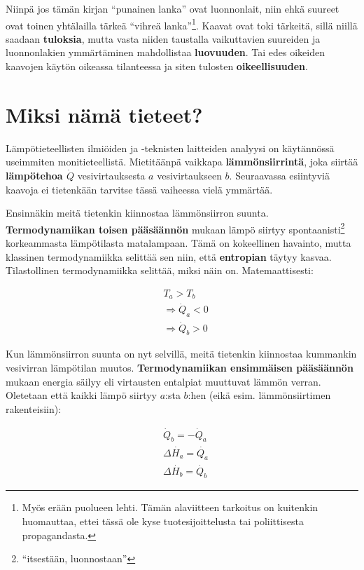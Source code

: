 \documentclass[12pt,a4paper,finnish]{book}
\begin{document}
Niinpä jos tämän kirjan ``punainen lanka'' ovat luonnonlait, niin ehkä suureet ovat toinen yhtälailla tärkeä
``vihreä lanka''\footnote{Myös erään puolueen lehti. Tämän alaviitteen tarkoitus on kuitenkin huomauttaa, 
ettei tässä ole kyse tuotesijoittelusta tai poliittisesta propagandasta.}. Kaavat ovat toki tärkeitä, sillä 
niillä saadaan \textbf{tuloksia}, mutta vasta niiden taustalla vaikuttavien suureiden ja luonnonlakien 
ymmärtäminen mahdollistaa \textbf{luovuuden}. Tai edes oikeiden kaavojen käytön oikeassa tilanteessa ja siten 
tulosten \textbf{oikeellisuuden}.

\section{Miksi nämä tieteet?}

Lämpötieteellisten ilmiöiden ja -teknisten laitteiden analyysi on käytännössä useimmiten monitieteellistä. 
Mietitäänpä vaikkapa \textbf{lämmönsiirrintä}, joka siirtää \textbf{lämpötehoa $\dot{Q}$} vesivirtauksesta $a$ 
vesivirtaukseen $b$. Seuraavassa esiintyviä kaavoja ei tietenkään tarvitse tässä vaiheessa vielä ymmärtää.

Ensinnäkin meitä tietenkin kiinnostaa lämmönsiirron suunta. \textbf{Termodynamiikan toisen pääsäännön} mukaan 
lämpö siirtyy spontaanisti\footnote{``itsestään, luonnostaan''} korkeammasta lämpötilasta matalampaan. Tämä on 
kokeellinen havainto, mutta klassinen termodynamiikka selittää sen niin, että \textbf{entropian} täytyy kasvaa. 
Tilastollinen termodynamiikka selittää, miksi näin on. Matemaattisesti:

\begin{align}
 &T_a > T_b\\
 &\Rightarrow \dot{Q}_a < 0\\
 &\Rightarrow \dot{Q}_b > 0
\end{align}

Kun lämmönsiirron suunta on nyt selvillä, meitä tietenkin kiinnostaa kummankin vesivirran lämpötilan muutos. 
\textbf{Termodynamiikan ensimmäisen pääsäännön} mukaan energia säilyy eli virtausten entalpiat muuttuvat 
lämmön verran. Oletetaan että kaikki lämpö siirtyy $a$:sta $b$:hen (eikä esim. lämmönsiirtimen rakenteisiin):

\begin{align}
 &\dot{Q}_b = -\dot{Q}_a\\
 &\Delta \dot{H_a} = \dot{Q_a}\\
 &\Delta \dot{H_b} = \dot{Q_b}
\end{align}
\end{document}
